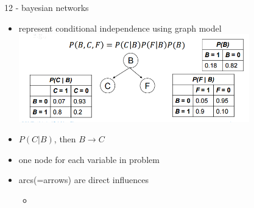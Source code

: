 \documentclass[11pt]{article}
\newcommand{\ee}[1]{\ensuremath{#1}}
\begin{document}
\begin{description}
\item 12 - bayesian networks
\begin{itemize}
	\item represent conditional independence using graph model
	\\ \includegraphics[width=100mm,scale=1]{bayes_net}
	\item \ee{P(C \vert B)}, then \ee{B \rightarrow C}
	\item one node for each variable in problem
	\item arcs(=arrows) are direct influences
	\begin{itemize}
		\item 
	\end{itemize}
\end{itemize}

\end{description}
\end{document}

